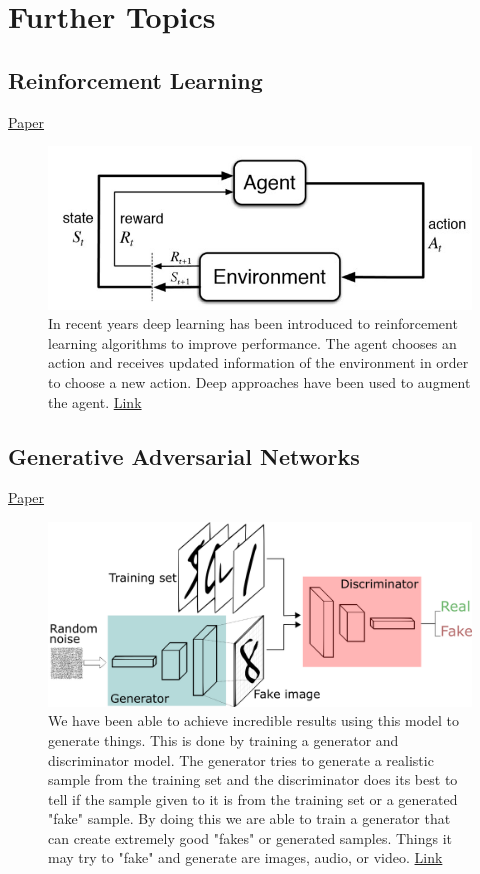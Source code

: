 \documentclass{article}
\begin{document}
\newpage
\section{Further Topics}

\subsection{Reinforcement Learning}
\href{https://deepmind.com/research/publications/playing-atari-deep-reinforcement-learning/}{Paper}
\begin{figure}[H]
    \centering
    \includegraphics[width=4.5in]{rl.jpg}
    \caption{In recent years deep learning has been introduced to reinforcement learning algorithms to improve performance. The agent chooses an action and receives updated information of the environment in order to choose a new action. Deep approaches have been used to augment the agent. \href{https://www.kdnuggets.com/2018/03/5-things-reinforcement-learning.html}{Link}}
    \label{fig:rl}
\end{figure}

\subsection{Generative Adversarial Networks}
\href{https://arxiv.org/abs/1406.2661}{Paper}
\begin{figure}[H]
    \centering
    \includegraphics[width=4.5in]{gans.png}
    \caption{We have been able to achieve incredible results using this model to generate things. This is done by training a generator and discriminator model. The generator tries to generate a realistic sample from the training set and the discriminator does its best to tell if the sample given to it is from the training set or a generated "fake" sample. By doing this we are able to train a generator that can create extremely good "fakes" or generated samples. Things it may try to "fake" and generate are images, audio, or video. \href{https://skymind.ai/wiki/generative-adversarial-network-gan}{Link}}
    \label{fig:rl}
\end{figure}
\end{document}
